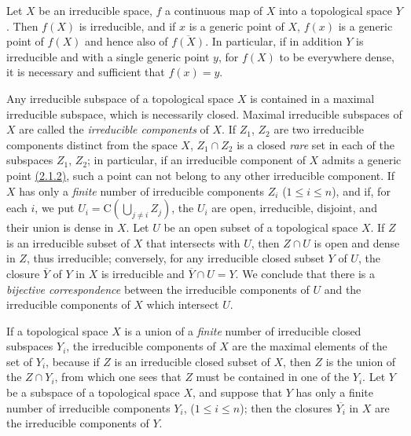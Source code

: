 \begin{env}[2.1.5]
\label{env-0.2.1.5}
Let $X$ be an irreducible space, $f$ a continuous map of $X$ into a topological
space $Y$. Then $f(X)$ is irreducible, and if $x$ is a generic point of $X$,
$f(x)$ is a generic point of $f(X)$ and hence also of $\overline{f(X)}$. In
particular, if in addition $Y$ is irreducible and with a single generic point
$y$, for $f(X)$ to be everywhere dense, it is necessary and sufficient that
$f(x)=y$.
\end{env}

\begin{env}[2.1.6]
\label{env-0.2.1.6}
Any irreducible subspace of a topological space $X$ is contained in a maximal
irreducible subspace, which is necessarily closed. Maximal irreducible subspaces
of $X$ are called the {\em irreducible components} of $X$. If $Z_1$, $Z_2$ are
two irreducible components distinct from the space $X$, $Z_1\cap Z_2$ is a
closed {\em rare} set in each of the subspaces $Z_1$, $Z_2$; in particular, if
an irreducible component of $X$ admits a generic point \hyperref[env-0.2.1.2]{(2.1.2)}, such a
point can not belong to any other irreducible component. If $X$ has only a
{\em finite} number of irreducible components $Z_i$
($1\leqslant i\leqslant n$), and if, for each $i$, we put
$U_i=\mathrm{C}(\bigcup_{j\neq i}Z_j)$, the $U_i$ are open, irreducible,
disjoint, and their union is dense in $X$. Let $U$ be an open subset of a
topological space $X$. If $Z$ is an irreducible subset of $X$ that intersects
with $U$, then $Z\cap U$ is open and dense in $Z$, thus irreducible; conversely,
for any irreducible closed subset $Y$ of $U$, the closure $\overline{Y}$ of $Y$
in $X$ is irreducible and $\overline{Y}\cap U=Y$. We conclude that there is a
{\em bijective correspondence} between the irreducible components of $U$ and
the irreducible components of $X$ which intersect $U$.
\end{env}

\begin{env}[2.1.7]
\label{env-0.2.1.7}
If a topological space $X$ is a union of a {\em finite} number of irreducible
closed subspaces $Y_i$, the irreducible components of $X$ are the maximal
elements of the set of $Y_i$, because if $Z$ is an irreducible closed subset of
$X$, then $Z$ is the union of the $Z\cap Y_i$, from which one sees that $Z$ must
be contained in one of the $Y_i$. Let $Y$ be a subspace of a topological space
$X$, and suppose that $Y$ has only a finite number of irreducible components
$Y_i$, ($1\leqslant i\leqslant n$); then the closures $\overline{Y_i}$ in $X$
are the irreducible components of $Y$.
\end{env}

